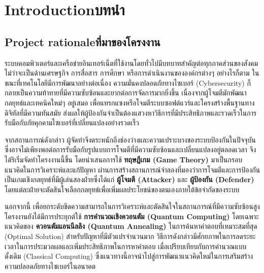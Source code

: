 \chapter{\ifenglish Introduction\else บทนำ\fi}

\section{\ifenglish Project rationale\else ที่มาของโครงงาน\fi}

\hspace{1.5em}ระบบคอมพิวเตอร์และเครือข่ายอินเทอร์เน็ตที่ใช้งานโดยทั่วไปมีบทบาทสำคัญต่อทุกภาคส่วนของสังคม 
ไม่ว่าจะเป็นด้านเศรษฐกิจ การสื่อสาร การศึกษา หรือการดำเนินงานขององค์กรต่างๆ 
อย่างไรก็ตาม ในขณะที่เทคโนโลยีมีการพัฒนาอย่างต่อเนื่อง ความมั่นคงปลอดภัยทางไซเบอร์ 
(Cybersecurity) ก็กลายเป็นความท้าทายที่มีความซับซ้อนและยากต่อการจัดการมากยิ่งขึ้น 
เนื่องจากผู้โจมตีมักพัฒนากลยุทธ์และเทคนิคใหม่ๆ อยู่เสมอ 
เพื่อแทรกแซงหรือโจมตีระบบซอฟต์แวร์และโครงสร้างพื้นฐานทางดิจิทัลที่มีความทันสมัย 
ส่งผลให้ผู้ป้องกันจำเป็นต้องแสวงหาวิธีการที่มีประสิทธิภาพและรวดเร็วในการรับมือกับภัยคุกคามไซเบอร์ที่เปลี่ยนแปลงอย่างรวดเร็ว

จากสถานการณ์ดังกล่าว ผู้จัดทำจึงตระหนักถึงช่องว่างและความเปราะบางของระบบป้องกันในปัจจุบัน 
ซึ่งอาจไม่เพียงพอต่อการรับมือกับรูปแบบการโจมตีที่มีความซับซ้อนและเปลี่ยนแปลงอยู่ตลอดเวลา 
จึงได้ริเริ่มจัดทำโครงงานนี้ขึ้น โดยนำเสนอการใช้ 
\textbf{ทฤษฎีเกม (Game Theory)} มาเป็นกรอบแนวคิดในการวิเคราะห์และแก้ปัญหา 
ผ่านการสร้างสถานการณ์จำลองที่มองว่าการโจมตีและการป้องกันเป็นเกมเชิงกลยุทธ์ที่มีผู้เล่นสองฝ่ายซึ่งได้แก่ 
\textbf{ผู้โจมตี (Attacker)} และ \textbf{ผู้ป้องกัน (Defender)} 
โดยแต่ละฝ่ายจะตัดสินใจเลือกกลยุทธ์เพื่อเพิ่มผลประโยชน์ของตนเองภายใต้ข้อจำกัดของระบบ

\begin{sloppypar}
นอกจากนี้ เพื่อยกระดับขีดความสามารถในการวิเคราะห์และตัดสินใจในสถานการณ์ที่มีความซับซ้อนสูง 
โครงงานยังได้มีการประยุกต์ใช้ \textbf{การคำนวณเชิงควอนตัม (Quantum Computing)} 
โดยเฉพาะแนวคิดของ \textbf{ควอนตัมแอนนีลลิง (Quantum Annealing)} 
ในการค้นหาคำตอบที่เหมาะสมที่สุด (Optimal Solution) สำหรับปัญหาที่มีตัวแปรจำนวนมาก 
วิธีการดังกล่าวมีศักยภาพในการลดระยะเวลาในการประมวลผลและเพิ่มประสิทธิภาพในการหาคำตอบ 
เมื่อเปรียบเทียบกับการคำนวณแบบดั้งเดิม (Classical Computing) 
ซึ่งแนวทางนี้อาจนำไปสู่การพัฒนาแนวคิดใหม่ในการเสริมสร้างความปลอดภัยทางไซเบอร์ในอนาคต
\end{sloppypar}

